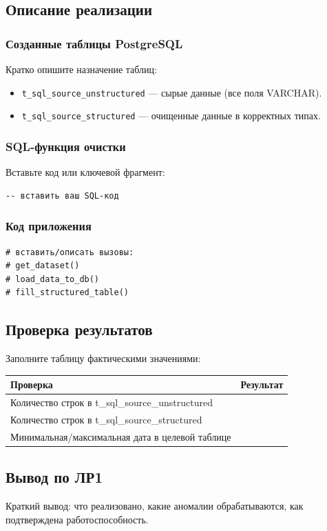 \documentclass[14pt,a4paper]{extarticle}
\begin{document}
\subsection{Описание реализации}
\subsubsection{Созданные таблицы PostgreSQL}
Кратко опишите назначение таблиц:
\begin{itemize}
    \item \texttt{t\_sql\_source\_unstructured} --- сырые данные (все поля VARCHAR).
    \item \texttt{t\_sql\_source\_structured} --- очищенные данные в корректных типах.
\end{itemize}

\subsubsection{SQL-функция очистки}
Вставьте код или ключевой фрагмент:
\begin{lstlisting}[style=sqlstyle,caption={Фрагмент fn_etl_data_load}]
-- вставить ваш SQL-код
\end{lstlisting}

\subsubsection{Код приложения}
\begin{lstlisting}[style=pystyle,caption={Верхнеуровневая функция etl()}]
# вставить/описать вызовы:
# get_dataset()
# load_data_to_db()
# fill_structured_table()
\end{lstlisting}

\subsection{Проверка результатов}
Заполните таблицу фактическими значениями:
\begin{longtable}{|p{}|p{}|}
\hline
Проверка & Результат \\ \hline
Количество строк в t\_sql\_source\_unstructured & \\ \hline
Количество строк в t\_sql\_source\_structured & \\ \hline
Минимальная/максимальная дата в целевой таблице & \\ \hline
\end{longtable}

\subsection{Вывод по ЛР1}
Краткий вывод: что реализовано, какие аномалии обрабатываются, как подтверждена работоспособность.
\end{document}
